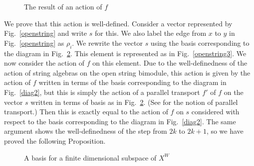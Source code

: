 \documentclass[12pt]{article}
\begin{document}
\begin{figure}[H]
\begin{center}
\caption{The result of an action of $f$}
\label{openstring2}
\end{center}
\end{figure}

We prove that this action is well-defined.
Consider a vector represented by Fig.~\ref{openstring} and
write $s$ for this.  We also label the edge from $x$ to $y$
in Fig.~\ref{openstring} as $\rho_i$.
We rewrite the vector $s$ using the basis corresponding to the
diagram in Fig.~\ref{diag}.  This element is represented as
in Fig.~\ref{openstring3}.  We now consider the action of $f$ on this
element.  Due to the well-definedness of the action of string algebras
on the open string bimodule, this action is given by the action of
$f$ written in terms of the basis corresponding to the diagram
in Fig.~\ref{diag2}, but this is simply the action of
a parallel transport $f'$ of $f$ on the vector $s$ written
in terms of basis as in Fig.~\ref{diag}.
(See \cite[Definition 11.18]{EK1} for the notion of
parallel transport.)  Then this is exactly equal to the action of
$f$ on $s$ considered with respect to the basis corresponding
to the diagram in Fig.~\ref{diag2}.  The same argument
shows the well-definedness of the step from $2k$ to
$2k+1$, so we have proved the following Proposition.

\begin{figure}[H]
\begin{center}
\caption{A basis for a finite dimensional subspace of $X^W$}
\label{diag}
\end{center}
\end{figure}
\end{document}
